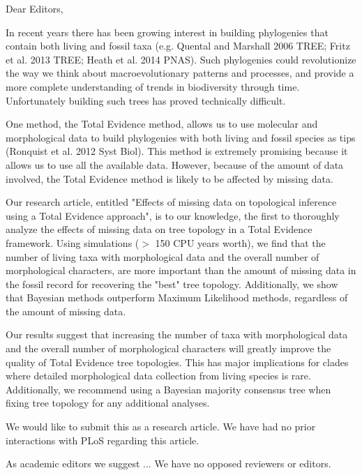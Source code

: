 \documentclass[11pt]{letter}
\begin{document}
\begin{letter}{}
\opening{Dear Editors,}

In recent years there has been growing interest in building phylogenies that contain both living and fossil taxa (e.g. Quental and Marshall 2006 TREE; Fritz et al. 2013 TREE; Heath et al. 2014 PNAS). Such phylogenies could revolutionize the way we think about macroevolutionary patterns and processes, and provide a more complete understanding of trends in biodiversity through time. Unfortunately building such trees has proved technically difficult. 

One method, the Total Evidence method, allows us to use molecular and morphological data to build phylogenies with both living and fossil species as tips (Ronquist et al. 2012 Syst Biol). This method is extremely promising because it allows us to use all the available data. However, because of the amount of data involved, the Total Evidence method is likely to be affected by missing data.

Our research article, entitled "Effects of missing data on topological inference using a Total Evidence approach", is to our knowledge, the first to thoroughly analyze the effects of missing data on tree topology in a Total Evidence framework. Using simulations ($>$ 150 CPU years worth), we find that the number of living taxa with morphological data and the overall number of morphological characters, are more important than the amount of missing data in the fossil record for recovering the "best" tree topology. Additionally, we show that Bayesian methods outperform Maximum Likelihood methods, regardless of the amount of missing data.

Our results suggest that increasing the number of taxa with morphological data and the overall number of morphological characters will greatly improve the quality of Total Evidence tree topologies. This has major implications for clades where detailed morphological data collection from living species is rare. Additionally, we recommend using a Bayesian majority consensus tree when fixing tree topology for any additional analyses.

We would like to submit this as a research article. We have had no prior interactions with PLoS regarding this article.

As academic editors we suggest ... We have no opposed reviewers or editors.


\end{letter}
\end{document}
